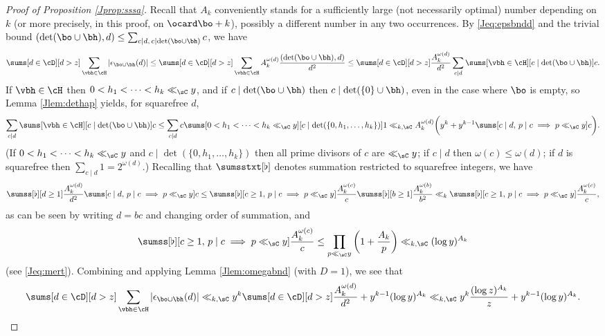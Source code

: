\documentclass[12pt, reqno, twoside, letterpaper]{amsart}
\begin{document}
\begin{jetsam}
\begin{proof}[Proof of Proposition \ref{Jprop:sssa}]
Recall that $A_k$ conveniently stands for a sufficiently large 
(not necessarily optimal) number depending on $k$ (or more 
precisely, in this proof, on $\ocard \bo + k$), possibly a 
different number in any two occurrences.
%
By \eqref{Jeq:epsbndd} and the trivial bound 
$
 (\det(\bo \cup \bh),d) 
   \le 
    \sum_{c \mid d, \, c \mid \det(\bo \cup \bh)} c
$, 
we have 
\[
 \sums[d \in \cD][d > z]
  \sum_{\vbh \in \cH} |\epsilon_{\bo \cup \bh}(d)|
   \le 
    \sums[d \in \cD][d > z]
     \sum_{\vbh \in \cH} A_k^{\omega(d)}\frac{(\det(\bo \cup \bh),d)}{d^2}
      \le 
       \sums[d \in \cD][d > z]
        \frac{A_k^{\omega(d)}}{d^2}
         \sum_{c \mid d}  
          \sums[\vbh \in \cH][c \mid \det(\bo \cup \bh)] c.
\]
%
If $\vbh \in \cH$ then $0 < h_1 < \cdots < h_k \ll_{\sC} y$, and 
if $c \mid \det(\bo \cup \bh)$ then $c \mid \det(\{0\} \cup \bh)$, 
even in the case where $\bo$ is empty, so Lemma \ref{Jlem:dethap} 
yields, for squarefree $d$, 
\[
 \sum_{c \mid d}  
  \sums[\vbh \in \cH][c \mid \det(\bo \cup \bh)] c
   \le 
    \sum_{c \mid d} c 
     \sums[0 < h_1 < \cdots < h_k \ll_{\sC} y][c \mid \det(\{0,h_1,\ldots,h_k\})] 1
      \ll_{k,\sC}
    A_k^{\omega(d)}
     \bigg(
      y^k 
      +
       y^{k - 1}
        \sums[c \mid d, \, p \mid c \implies p \ll_{\sC} y] c
     \bigg).
\]
%
(If $0 < h_1 < \cdots < h_k \ll_{\sC} y$ and 
$c \mid \det(\{0,h_1,\ldots,h_k\})$ then all prime divisors of $c$ 
are $\ll_{\sC} y$;  
if $c \mid d$ then $\omega(c) \le \omega(d)$; 
if $d$ is squarefree then $\sum_{c \mid d} 1 = 2^{\omega(d)}$.)
%
Recalling that $\sumsstxt[\flat]$ denotes summation restricted to 
squarefree integers, we have 
\[
 \sumss[\flat][d \ge 1] 
  \frac{A_k^{\omega(d)}}{d^2}
   \sums[c \mid d, \, p \mid c \implies p \ll_{\sC} y] c
    \le 
     \sumss[\flat][c \ge 1, \, p \mid c \implies p \ll_{\sC} y] \frac{A_k^{\omega(c)}}{c}
      \sumss[\flat][b \ge 1] \frac{A_k^{\omega(b)}}{b^2}
       \ll_k
        \sumss[\flat][c \ge 1, \, p \mid c \implies p \ll_{\sC} y] \frac{A_k^{\omega(c)}}{c},
\]
as can be seen by writing $d = bc$ and changing order of 
summation, and    
\[
 \sumss[\flat][c \ge 1, \, p \mid c \implies p \ll_{\sC} y] \frac{A_k^{\omega(c)}}{c}
  \le 
   \prod_{p \ll_{\sC} y}
    \bigg(1 + \frac{A_k}{p}\bigg)
        \ll_{k,\sC} (\log y)^{A_k}  
\]
(see \eqref{Jeq:mert}).
%
Combining and applying Lemma \ref{Jlem:omegabnd} (with $D = 1$), we 
see that 
{\small 
\begin{equation}
 \label{Jeq:lemsssapf2}
 \sums[d \in \cD][d > z]
  \sum_{\vbh \in \cH} |\epsilon_{\bo \cup \bh}(d)|
   \ll_{k,\sC}
    y^k\sums[d \in \cD][d > z] \frac{A_k^{\omega(d)}}{d^2}
     + y^{k - 1}(\log y)^{A_k} 
     \ll_{k,\sC}
       y^k\frac{(\log z)^{A_k}}{z} + y^{k - 1}(\log y)^{A_k}.
\end{equation}
}


\end{proof}
\end{jetsam}
\end{document}
